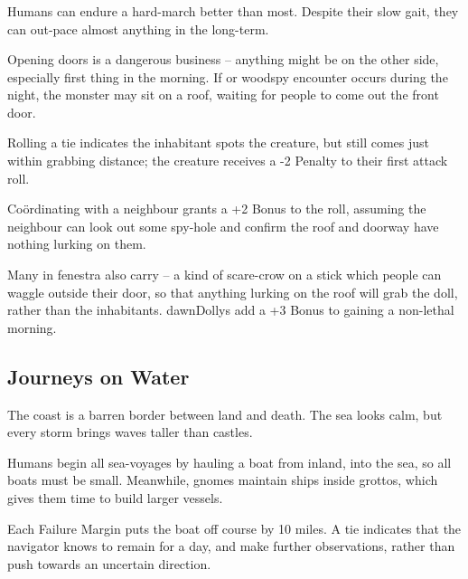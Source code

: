 \begin{multicols}{2}
\subsubsection{}

Humans can endure a hard-march better than most.
Despite their slow gait, they can out-pace almost anything in the long-term.%

Opening doors is a dangerous business -- anything might be on the other side, especially first thing in the morning.
If  or \gls{woodspy} encounter occurs during the night, the \gls{monster} may sit on a roof, waiting for people to come out the front door.

Rolling a tie indicates the inhabitant spots the creature, but still comes just within grabbing distance; the creature receives a -2 Penalty to their first attack roll.

Co\"ordinating with a neighbour grants a +2 Bonus to the roll, assuming the neighbour can look out some spy-hole and confirm the roof and doorway have nothing lurking on them.

Many in \gls{fenestra} also carry  -- a kind of scare-crow on a stick which people can waggle outside their door, so that anything lurking on the roof will grab the doll, rather than the inhabitants.
\Glspl{dawnDolly} add a +3 Bonus to gaining a non-lethal morning.

\subsection{Journeys on Water}

The coast is a barren border between land and death.
The sea looks calm, but every \gls{storm} brings waves taller than castles.

Humans begin all sea-voyages by hauling a boat from inland, into the sea, so all boats must be small.
Meanwhile, gnomes maintain ships inside grottos, which gives them time to build larger vessels.


Each Failure Margin puts the boat off course by 10 miles.
A tie indicates that the navigator knows to remain for a day, and make further observations, rather than push towards an uncertain direction.


\end{multicols}

